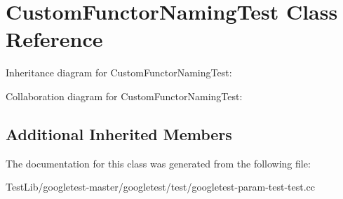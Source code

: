 \hypertarget{classCustomFunctorNamingTest}{}\section{Custom\+Functor\+Naming\+Test Class Reference}
\label{classCustomFunctorNamingTest}


Inheritance diagram for Custom\+Functor\+Naming\+Test\+:


Collaboration diagram for Custom\+Functor\+Naming\+Test\+:
\subsection*{Additional Inherited Members}


The documentation for this class was generated from the following file\+:\begin{DoxyCompactItemize}
\item 
Test\+Lib/googletest-\/master/googletest/test/googletest-\/param-\/test-\/test.\+cc\end{DoxyCompactItemize}
